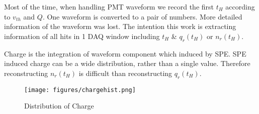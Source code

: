 
Most of the time, when handling PMT waveform we record the first $t_{H}$ according to $v_{th}$ and $Q$. One waveform is converted to a pair of numbers. More detailed information of the waveform was lost. The intention this work is extracting information of all hits in 1 DAQ window including $t_{H}$ \& $q_{r}(t_{H})$ or $n_{r}(t_{H})$. 

Charge is the integration of waveform component which induced by SPE. SPE induced charge can be a wide distribution, rather than a single value. Therefore reconstructing $n_{r}(t_{H})$ is difficult than reconstructing $q_{r}(t_{H})$. 

\begin{figure}[H]
    \centering
    \texttt{[image: figures/chargehist.png]}
    \caption{\label{fig:charge} Distribution of Charge}
\end{figure}


